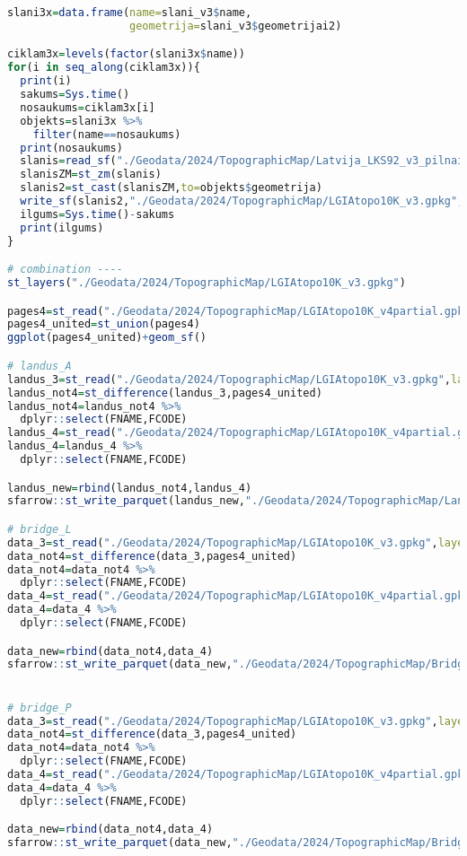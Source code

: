 \documentclass[
]{book}
\begin{document}
\begin{lstlisting}[language=R]
slani3x=data.frame(name=slani_v3$name,
                   geometrija=slani_v3$geometrijai2)

ciklam3x=levels(factor(slani3x$name))
for(i in seq_along(ciklam3x)){
  print(i)
  sakums=Sys.time()
  nosaukums=ciklam3x[i]
  objekts=slani3x %>% 
    filter(name==nosaukums)
  print(nosaukums)
  slanis=read_sf("./Geodata/2024/TopographicMap/Latvija_LKS92_v3_pilnais.gdb/",layer=nosaukums)
  slanisZM=st_zm(slanis)
  slanis2=st_cast(slanisZM,to=objekts$geometrija)
  write_sf(slanis2,"./Geodata/2024/TopographicMap/LGIAtopo10K_v3.gpkg",layer=nosaukums,append=FALSE)
  ilgums=Sys.time()-sakums
  print(ilgums)
}

# combination ----
st_layers("./Geodata/2024/TopographicMap/LGIAtopo10K_v3.gpkg")

pages4=st_read("./Geodata/2024/TopographicMap/LGIAtopo10K_v4partial.gpkg",layer="Topo10_lapas")
pages4_united=st_union(pages4)
ggplot(pages4_united)+geom_sf()

# landus_A
landus_3=st_read("./Geodata/2024/TopographicMap/LGIAtopo10K_v3.gpkg",layer="landus_A")
landus_not4=st_difference(landus_3,pages4_united)
landus_not4=landus_not4 %>% 
  dplyr::select(FNAME,FCODE)
landus_4=st_read("./Geodata/2024/TopographicMap/LGIAtopo10K_v4partial.gpkg",layer="landus_A")
landus_4=landus_4 %>% 
  dplyr::select(FNAME,FCODE)

landus_new=rbind(landus_not4,landus_4)
sfarrow::st_write_parquet(landus_new,"./Geodata/2024/TopographicMap/LandusA_COMB.parquet")

# bridge_L
data_3=st_read("./Geodata/2024/TopographicMap/LGIAtopo10K_v3.gpkg",layer="bridge_L")
data_not4=st_difference(data_3,pages4_united)
data_not4=data_not4 %>% 
  dplyr::select(FNAME,FCODE)
data_4=st_read("./Geodata/2024/TopographicMap/LGIAtopo10K_v4partial.gpkg",layer="bridge_L")
data_4=data_4 %>% 
  dplyr::select(FNAME,FCODE)

data_new=rbind(data_not4,data_4)
sfarrow::st_write_parquet(data_new,"./Geodata/2024/TopographicMap/BridgeL_COMB.parquet")


# bridge_P
data_3=st_read("./Geodata/2024/TopographicMap/LGIAtopo10K_v3.gpkg",layer="bridge_P")
data_not4=st_difference(data_3,pages4_united)
data_not4=data_not4 %>% 
  dplyr::select(FNAME,FCODE)
data_4=st_read("./Geodata/2024/TopographicMap/LGIAtopo10K_v4partial.gpkg",layer="bridge_P")
data_4=data_4 %>% 
  dplyr::select(FNAME,FCODE)

data_new=rbind(data_not4,data_4)
sfarrow::st_write_parquet(data_new,"./Geodata/2024/TopographicMap/BridgeP_COMB.parquet")



\end{lstlisting}
\end{document}

